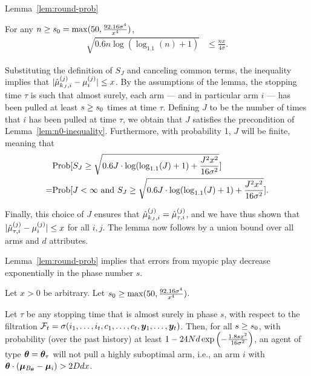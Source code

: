 \begin{extraproof}{Lemma~\ref{lem:round-prob}}
\begin{lemma} \label{lem:n0-inequality}
For any $n \geq s_0 = \max (50, \frac{92.16 \sigma^4}{x^4})$, 
\begin{align*}
\sqrt{0.6 n \log (\log_{1.1}(n) + 1)} & \leq \frac{n x}{4 \sigma}. 
\end{align*}
\end{lemma}

Substituting the definition of $S_J$ and canceling common terms,
the inequality implies that
$|\hat{\mu}_{k_J,i}^{(j)} - \mu_{i}^{(j)}| \leq x$.
By the assumptions of the lemma,
the stopping time $\tau$ is such that almost surely, each arm --- and
in particular arm $i$ --- has been pulled at least
$s \geq s_0$ times at time $\tau$.
Defining $J$ to be the number of times that $i$ has been pulled at
time $\tau$, we obtain that $J$ satisfies the precondition of
Lemma~\ref{lem:n0-inequality}.
Furthermore, with probability 1, $J$ will be finite, meaning that
\begin{align*}
& \Prob{S_J \geq 
\sqrt{0.6 J \cdot \log (\log_{1.1}(J) + 1) + \frac{J^2 x^2}{16
    \sigma^2}}}\\
= & \Prob{J < \infty \mbox{ and } S_J \geq 
\sqrt{0.6 J \cdot \log (\log_{1.1}(J) + 1) + \frac{J^2 x^2}{16
    \sigma^2}}}.
\end{align*}

Finally, this choice of $J$ ensures that
$\hat{\mu}_{k_J,i}^{(j)} = \hat{\mu}_{\tau,i}^{(j)}$,
and we have thus shown that
$|\hat{\mu}_{\tau,i}^{(j)} - \mu_{i}^{(j)}| \leq x$ for all $i,j$.
The lemma now follows by a union bound over all \ARMNUM arms and $d$
attributes.
\end{extraproof}


Lemma~\ref{lem:round-prob} implies that errors from myopic play
decrease exponentially in the phase number $s$.

\begin{corollary} \label{cor:right-choice}
Let $x > 0$ be arbitrary.
Let $s_0 \geq \max (50, \frac{92.16 \sigma^4}{x^4})$.

Let $\tau$ be any stopping time that is almost surely  in phase $s$,
with respect to the filtration
$\mathcal{F}_{t} = \sigma (i_{1}, \ldots, i_{t},
                          c_{1}, \ldots, c_{t},
                          \bm{y}_{1}, \ldots, \bm{y}_{t})$.
Then, for all $s \geq s_0$,
with probability (over the past history) at least 
$1 - 24 N d \exp\left(-\frac{1.8 s x^2}{16 \sigma^2} \right)$,
an agent of type $\bm{\theta} = \bm{\theta}_{\tau}$ 
will not pull a highly suboptimal arm, i.e., an arm $i$ with 
$\bm{\theta} \cdot (\bm{\mu}_{B_{\bm{\theta}}} - \bm{\mu}_{i}) > 2D d x$.
\end{corollary}

